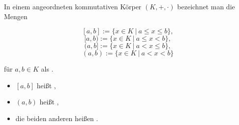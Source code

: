 In einem angeordneten kommutativen Körper $(K, +, \cdot)$ bezeichnet man die Mengen

$$[a, b] := \{x \in K \ | \ a \leq x \leq b \},$$
$$[a, b) := \{x \in K \ | \ a \leq x < b \},$$
$$(a, b] := \{x \in K \ | \ a < x \leq b \},$$
$$(a, b) := \{x \in K \ | \ a < x < b \}$$

für $a, b \in K$ als .

\begin{itemize}
    \item $[a, b]$ heißt ,
    \item $(a, b)$ heißt ,
    \item die beiden anderen heißen .
\end{itemize}